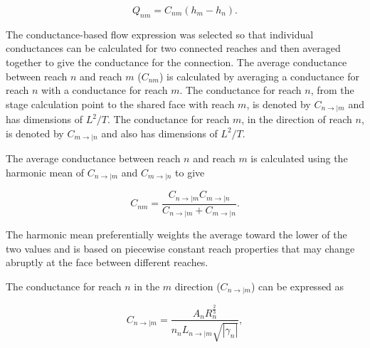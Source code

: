\documentclass[fleqn]{article}
\begin{document}
\begin{equation}
  Q_{nm} = C_{nm} \left ( h_m - h_n \right ).
\end{equation}

\noindent The conductance-based flow expression was selected so that individual conductances can be calculated for two connected reaches and then averaged together to give the conductance for the connection.  The average conductance between reach $n$ and reach $m$ ($C_{nm}$) is calculated by averaging a conductance for reach $n$ with a conductance for reach $m$.  The conductance for reach $n$, from the stage calculation point to the shared face with reach $m$, is denoted by $C_{n \rightarrow | m}$ and has dimensions of $L^2/T$.  The conductance for reach $m$, in the direction of reach $n$, is denoted by $C_{m \rightarrow | n}$ and also has dimensions of $L^2/T$.

The average conductance between reach $n$ and reach $m$ is calculated using the harmonic mean of $C_{n \rightarrow | m}$ and $C_{m \rightarrow | n}$ to give

\begin{equation}
  C_{nm} = \frac{C_{n \rightarrow | m}  C_{m \rightarrow | n}}{C_{n \rightarrow | m} + C_{m \rightarrow | n}}.
\end{equation}

\noindent The harmonic mean preferentially weights the average toward the lower of the two values and is based on piecewise constant reach properties that may change abruptly at the face between different reaches.

The conductance for reach $n$ in the $m$ direction ($C_{n \rightarrow | m}$) can be expressed as

\begin{equation}
  C_{n \rightarrow | m} = 
  \frac{
  A_n 
  R_{n}^{\frac{2}{3}}
  }
  {n_n
  L_{n \rightarrow | m}
  \sqrt{| \gamma_n |}
  },
\label{eqn:cn}
\end{equation}



\end{document}
